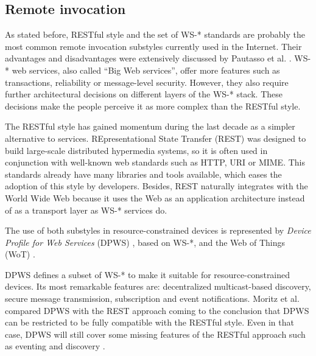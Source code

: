\subsection{Remote invocation}
\label{sec:remote_invocation}


As stated before, RESTful style and the set of WS-* standards are probably the most common remote invocation substyles currently used in the Internet.
Their advantages and disadvantages were extensively discussed by Pautasso et al. \cite{pautasso_restful_2008}.
WS-* web services, also called ``Big Web services'', offer more features such as transactions, reliability or message-level security.
However, they also require further architectural decisions on different layers of the WS-* stack.
These decisions make the people perceive it as more complex than the RESTful style. %


The RESTful style has gained momentum during the last decade as a simpler alternative to services.
REpresentational State Transfer (REST) was designed to build large-scale distributed hypermedia systems,
so it is often used in conjunction with well-known web standards such as HTTP, URI or MIME.
This standards already have many libraries and tools available, which eases the adoption of this style by developers.
Besides, REST naturally integrates with the World Wide Web because it uses the Web as an application architecture instead of as a transport layer as WS-* services do.


\medskip


The use of both substyles in resource-constrained devices is represented by
\textit{Device Profile for Web Services} (DPWS) \cite{moritz_devices_2010}, based on WS-*,
and the Web of Things (WoT) \cite{guinard_internet_2011}. %




DPWS defines a subset of WS-* to make it suitable for resource-constrained devices.
Its most remarkable features are: decentralized multicast-based discovery, secure message transmission, subscription and event notifications.
Moritz et al. compared DPWS with the REST approach coming to the conclusion that DPWS can be restricted to be fully compatible with the RESTful style.
Even in that case, DPWS will still cover some missing features of the RESTful approach such as eventing and discovery \cite{moritz_devices_2010}.


